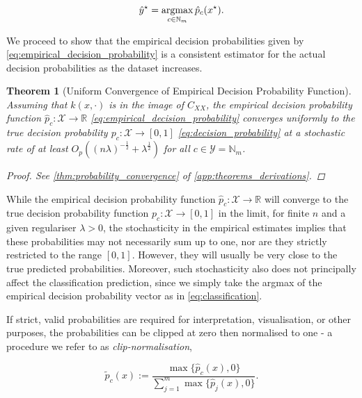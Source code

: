 \documentclass{article}
\newcommand{\argmax}{\operatornamewithlimits{argmax}}
\newtheorem{theorem}{Theorem}[section]
\begin{document}
	\begin{equation}
		\hat{y}^{\star} = \argmax_{c \in \mathbb{N}_{m}} \hat{p}_{c}(x^{\star}).
	\label{eq:classification}
	\end{equation}

	We proceed to show that the empirical decision probabilities given by \eqref{eq:empirical_decision_probability} is a consistent estimator for the actual decision probabilities as the dataset increases.
	
	\begin{theorem}[Uniform Convergence of Empirical Decision Probability Function]
		\label{thm:probability_convergence_copy}
		Assuming that $k(x, \cdot)$ is in the image of $C_{XX}$, the empirical decision probability function $\hat{p}_{c} : \mathcal{X} \to \mathbb{R}$ \eqref{eq:empirical_decision_probability} converges uniformly to the true decision probability $p_{c} : \mathcal{X} \to [0, 1]$ \eqref{eq:decision_probability} at a stochastic rate of at least $O_{p}((n \lambda)^{-\frac{1}{2}} + \lambda^{\frac{1}{2}})$ for all $c \in \mathcal{Y} = \mathbb{N}_{m}$.
		
		\begin{proof}
			See \cref{thm:probability_convergence} of \cref{app:theorems_derivations}.
		\end{proof}
	\end{theorem}

	While the empirical decision probability function $\hat{p}_{c} : \mathcal{X} \to \mathbb{R}$ will converge to the true decision probability function  $p_{c} : \mathcal{X} \to [0, 1]$ in the limit, for finite $n$ and a given regulariser $\lambda > 0$, the stochasticity in the empirical estimates implies that these probabilities may not necessarily sum up to one, nor are they strictly restricted to the range $[0, 1]$. However, they will usually be very close to the true predicted probabilities. Moreover, such stochasticity also does not principally affect the classification prediction, since we simply take the argmax of the empirical decision probability vector as in \eqref{eq:classification}.
	
	If strict, valid probabilities are required for interpretation, visualisation, or other purposes, the probabilities can be clipped at zero then normalised to one - a procedure we refer to as \textit{clip-normalisation},
	
	\begin{equation}
		\tilde{p}_{c}(x) := \frac{\max\{\hat{p}_{c}(x), 0\}}{\sum_{j = 1}^{m} \max\{\hat{p}_{j}(x), 0\}}.
	\label{eq:probability_clip_normalise}
	\end{equation}
	
\end{document}
